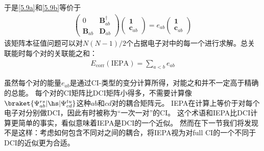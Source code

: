 于是\autoref{5.9a}和\autoref{5.9b}等价于
\begin{align}
    \begin{pmatrix}
        0 & \mathbf{B}^\dagger_{ab} \\
        \mathbf{B}_{ab} & \mathbf{D}_{ab}
    \end{pmatrix}
    \begin{pmatrix}
        \mathbf{1} \\
        \mathbf{c}_{ab}
    \end{pmatrix}
    =e_{ab}
    \begin{pmatrix}
        \mathbf{1} \\
        \mathbf{c}_{ab}
    \end{pmatrix}
\end{align}
该矩阵本征值问题可以对$N(N-1)/2$个占据电子对中的每一个进行求解。总关联能时每个对的关联能之和：
\begin{align}
    E_\text{corr}(\text{IEPA})=\sum_{a<b}e_{ab}
\end{align}

虽然每个对的能量$e_{ab}$是通过CI-类型的变分计算所得，对能之和并不一定高于精确的总能。
每个对的CI矩阵比DCI矩阵小得多，不需要计算像$\braket{\Psi^{rs}_{ab}|\hs|\Psi^{tu}_{cd}}$这种$ab$和$cd$对的耦合矩阵元。
IEPA在计算上等价于对每个电子对分别做DCI，因此有时被称为“一次一对”的CI。
这个术语和IEPA比DCI计算更简单的事实，看似意味着IEPA是DCI的一个近似。
然而在下一节我们将发现不是这样：考虑如何包含不同对之间的耦合，将IEPA视为对full CI的一个不同于DCI的近似更为合适。

